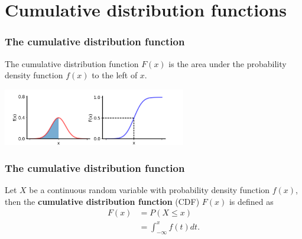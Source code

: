 \documentclass[10pt]{beamer}
\begin{document}
\section{Cumulative distribution functions}
\begin{frame}
\frametitle{The cumulative distribution function}

The cumulative distribution function $F(x)$ is the area under the probability density function $f(x)$ to the left of $x$.

\center \includegraphics[height=2.5cm]{images/pdf_cdf_1.png}

\end{frame}

\begin{frame}
\frametitle{The cumulative distribution function}


\vspace{.3cm}

\begin{definition} 
Let $X$ be a continuous random variable with probability density function $f(x)$, then the \textbf{cumulative distribution function} (CDF) $F(x)$ is defined as
\begin{align*}
F(x) &= P(X \leq x)\\
&= \int_{-\infty}^x f(t) dt.
\end{align*} 
\end{definition}

\vspace{0.5cm}


\end{frame}
\end{document}
